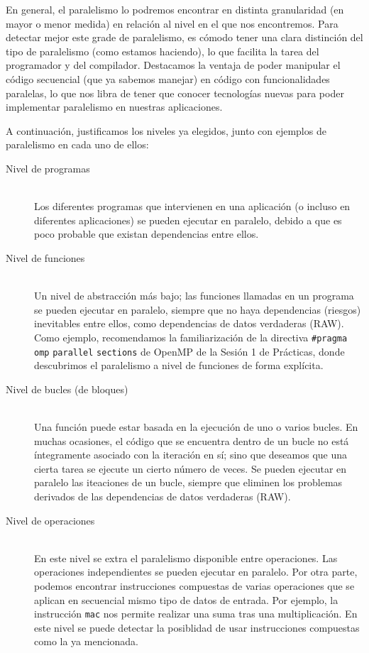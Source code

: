 En general, el paralelismo lo podremos encontrar en distinta granularidad (en mayor o menor medida) en relación al nivel en el que nos encontremos. Para detectar mejor este grade de paralelismo, es cómodo tener una clara distinción del tipo de paralelismo (como estamos haciendo), lo que facilita la tarea del programador y del compilador. Destacamos la ventaja de poder manipular el código secuencial (que ya sabemos manejar) en código con funcionalidades paralelas, lo que nos libra de tener que conocer tecnologías nuevas para poder implementar paralelismo en nuestras aplicaciones.

A continuación, justificamos los niveles ya elegidos, junto con ejemplos de paralelismo en cada uno de ellos:
\begin{description}
    \item [Nivel de programas]~\\
        Los diferentes programas que intervienen en una aplicación (o incluso en diferentes aplicaciones) se pueden ejecutar en paralelo, debido a que es poco probable que existan dependencias entre ellos.
    \item [Nivel de funciones]~\\
    Un nivel de abstracción más bajo; las funciones llamadas en un programa se pueden ejecutar en paralelo, siempre que no haya dependencias (riesgos) inevitables entre ellos, como dependencias de datos verdaderas (RAW). Como ejemplo, recomendamos la familiarización de la directiva \verb|#pragma| \verb|omp| \verb|parallel| \verb|sections| de OpenMP de la Sesión 1 de Prácticas, donde descubrimos el paralelismo a nivel de funciones de forma explícita.
    \item [Nivel de bucles (de bloques)]~\\
        Una función puede estar basada en la ejecución de uno o varios bucles. En muchas ocasiones, el código que se encuentra dentro de un bucle no está íntegramente asociado con la iteración en sí; sino que deseamos que una cierta tarea se ejecute un cierto número de veces. Se pueden ejecutar en paralelo las iteaciones de un bucle, siempre que eliminen los problemas derivados de las dependencias de datos verdaderas (RAW). 
    \item [Nivel de operaciones]~\\
        En este nivel se extra el paralelismo disponible entre operaciones. Las operaciones independientes se pueden ejecutar en paralelo. Por otra parte, podemos encontrar instrucciones compuestas de varias operaciones que se aplican en secuencial mismo tipo de datos de entrada. Por ejemplo, la instrucción \verb|mac| nos permite realizar una suma tras una multiplicación. En este nivel se puede detectar la posiblidad de usar instrucciones compuestas como la ya mencionada.
\end{description}

